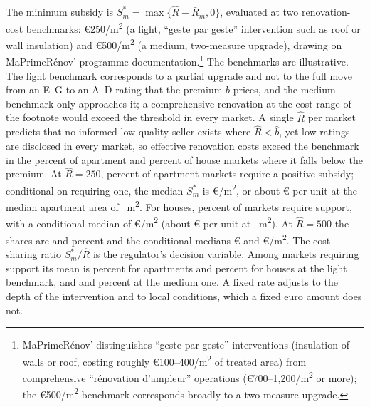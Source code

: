 \documentclass[10pt,letterpaper]{bp-template-concise}
\begin{document}
The minimum subsidy is $S^*_m=\max\{\hat R-\bar R_m,0\}$, evaluated at two renovation-cost benchmarks: \euro{}250/m\textsuperscript{2} (a light, ``geste par geste'' intervention such as roof or wall insulation) and \euro{}500/m\textsuperscript{2} (a medium, two-measure upgrade), drawing on MaPrimeR\'enov' programme documentation.\footnote{MaPrimeR\'enov' distinguishes ``geste par geste'' interventions (insulation of walls or roof, costing roughly \euro{}100--400/m\textsuperscript{2} of treated area) from comprehensive ``r\'enovation d'ampleur'' operations (\euro{}700--1{,}200/m\textsuperscript{2} or more); the \euro{}500/m\textsuperscript{2} benchmark corresponds broadly to a two-measure upgrade.} The benchmarks are illustrative. The light benchmark corresponds to a partial upgrade and not to the full move from an E--G to an A--D rating that the premium $b$ prices, and the medium benchmark only approaches it; a comprehensive renovation at the cost range of the footnote would exceed the threshold in every market. A single $\hat R$ per market predicts that no informed low-quality seller exists where $\hat R<\hat b$, yet low ratings are disclosed in every market, so effective renovation costs exceed the benchmark in the \attBaseNoSubsidyTwoFiftyApt{} percent of apartment and \attBaseNoSubsidyTwoFiftyHouse{} percent of house markets where it falls below the premium. At $\hat R=250$, \attScBaseShareTwoFiftyApt{} percent of apartment markets require a positive subsidy; conditional on requiring one, the median $S^*_m$ is \euro{}\attBaseSMedTwoFiftyApt{}/m\textsuperscript{2}, or about \euro{}\attBaseUnitTwoFiftyApt{} per unit at the median apartment area of \attBaseAreaMedApt{}~m\textsuperscript{2}. For houses, \attScBaseShareTwoFiftyHouse{} percent of markets require support, with a conditional median of \euro{}\attBaseSMedTwoFiftyHouse{}/m\textsuperscript{2} (about \euro{}\attBaseUnitTwoFiftyHouse{} per unit at \attBaseAreaMedHouse{}~m\textsuperscript{2}). At $\hat R=500$ the shares are \attScBaseShareFiveHundredApt{} and \attScBaseShareFiveHundredHouse{} percent and the conditional medians \euro{}\attBaseSMedFiveHundredApt{} and \euro{}\attBaseSMedFiveHundredHouse{}/m\textsuperscript{2}. The cost-sharing ratio $S^*_m/\hat R$ is the regulator's decision variable. Among markets requiring support its mean is \attBaseCostShareTwoFiftyApt{} percent for apartments and \attBaseCostShareTwoFiftyHouse{} percent for houses at the light benchmark, and \attBaseCostShareFiveHundredApt{} and \attBaseCostShareFiveHundredHouse{} percent at the medium one. A fixed rate adjusts to the depth of the intervention and to local conditions, which a fixed euro amount does not.
\end{document}
